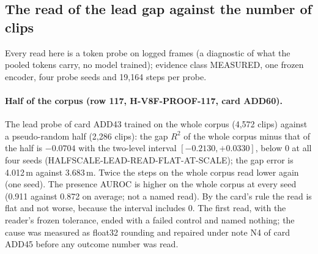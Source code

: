 \subsection{The read of the lead gap against the number of clips}\label{sec:fracscale}
Every read here is a  token probe on logged frames (a diagnostic of what the pooled tokens carry, no model trained); evidence class MEASURED, one frozen encoder, four probe seeds and 19,164 steps per probe.

\paragraph{Half of the corpus (row 117, H-V8F-PROOF-117, card ADD60).} The lead probe of card ADD43 trained on the whole corpus (4,572 clips) against a pseudo-random half (2,286 clips): the gap $R^2$ of the whole corpus minus that of the half is $-0.0704$ with the two-level interval $[-0.2130,+0.0330]$, below 0 at all four seeds (HALFSCALE-LEAD-READ-FLAT-AT-SCALE); the gap error is 4.012\,m against 3.683\,m. Twice the steps on the whole corpus read lower again (one seed). The presence AUROC is higher on the whole corpus at every seed (0.911 against 0.872 on average; not a named read). By the card's rule the read is flat and not worse, because the interval includes 0. The first read, with the reader's frozen tolerance, ended with a failed control and named nothing; the cause was measured as float32 rounding and repaired under note N4 of card ADD45 before any outcome number was read.

